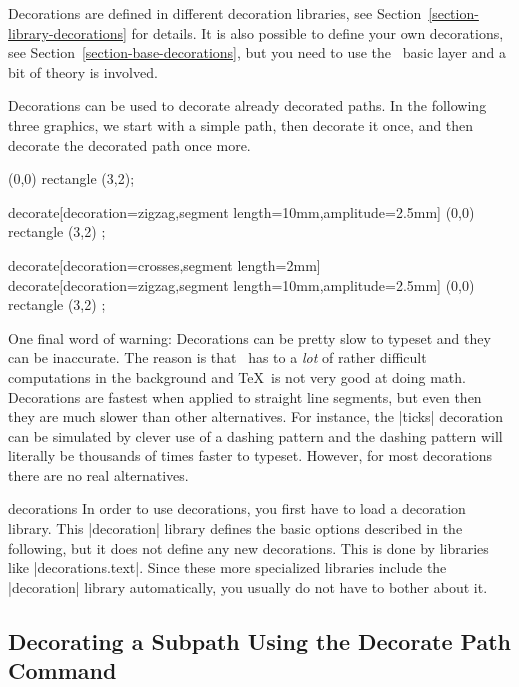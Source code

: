 Decorations are defined in different decoration libraries, see
Section~\ref{section-library-decorations} for details. It is also possible to
define your own decorations, see Section~\ref{section-base-decorations}, but
you need to use the \pgfname\ basic layer and a bit of theory is involved.

Decorations can be used to decorate already decorated paths. In the following
three graphics, we start with a simple path, then decorate it once, and then
decorate the decorated path once more.
%
\begin{codeexample}[]
\tikz \fill [fill=blue!20,draw=blue,thick]
  (0,0) rectangle (3,2);
\end{codeexample}
%
\begin{codeexample}[]
\tikz \fill [fill=blue!20,draw=blue,thick]
  decorate[decoration={zigzag,segment length=10mm,amplitude=2.5mm}]
    { (0,0) rectangle (3,2) };
\end{codeexample}
%
\begin{codeexample}[]
\tikz \fill [fill=blue!20,draw=blue,thick]
  decorate[decoration={crosses,segment length=2mm}] {
    decorate[decoration={zigzag,segment length=10mm,amplitude=2.5mm}] {
      (0,0) rectangle (3,2)
    }
  };
\end{codeexample}

One final word of warning: Decorations can be pretty slow to typeset and they
can be inaccurate. The reason is that \pgfname\ has to a \emph{lot} of rather
difficult computations in the background and \TeX\ is not very good at doing
math. Decorations are fastest when applied to straight line segments, but even
then they are much slower than other alternatives. For instance, the |ticks|
decoration can be simulated by clever use of a dashing pattern and the dashing
pattern will literally be thousands of times faster to typeset. However, for
most decorations there are no real alternatives.

\begin{tikzlibrary}{decorations}
    In order to use decorations, you first have to load a decoration library.
    This |decoration| library defines the basic options described in the
    following, but it does not define any new decorations. This is done by
    libraries like |decorations.text|. Since these more specialized libraries
    include the |decoration| library automatically, you usually do not have to
    bother about it.
\end{tikzlibrary}


\subsection{Decorating a Subpath Using the Decorate Path Command}

